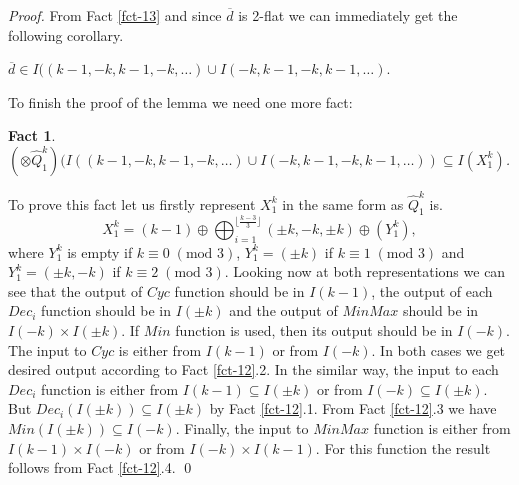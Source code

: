 \documentclass{llncs}
\newtheorem{fact}[theorem]{Fact}
\begin{document}
\begin{proof}
From Fact \ref{fct-13} and since $\overline{d}$ is 2-flat we can immediately 
get the following corollary.
\begin{corollary}
$\overline{d} \in I((k-1,-k,k-1,-k,\ldots) \cup I(-k,k-1,-k,k-1,\ldots)$.
\end{corollary}
To finish the proof of the lemma we need one more fact:
\begin{fact}
$(\otimes \hat{Q}^k_1)(I((k-1,-k,k-1,-k,\ldots) \cup 
I(-k,k-1,-k,k-1,\ldots)) 
\subseteq I(X^k_1)$.
\end{fact}
To prove this fact let us firstly represent $X^k_1$ in the same form as 
$\hat{Q}^k_1$ is.
\[X^k_1 = (k-1) \oplus \bigoplus_{i=1}^{\lfloor\frac{k-3}{3}\rfloor} (\pm 
k,-k,\pm k) \oplus (Y^k_1), \]
where $Y^k_1$ is empty if $k\equiv 0 \;(\mbox{mod } 3)$, $Y^k_1 = (\pm k)$ if 
$k\equiv 1 \;(\mbox{mod } 3)$ and $Y^k_1 = (\pm k,-k)$ if 
$k\equiv 2 \;(\mbox{mod } 3)$. Looking now at both representations we can see 
that the output of $Cyc$ function should be in $I(k-1)$, the output of each 
$Dec_i$ function should be in $I(\pm k)$ and the output of $MinMax$ should be 
in $I(-k)\times I(\pm k)$. If $Min$ function is used, then its output should 
be in $I(-k)$. The input to $Cyc$ is either from $I(k-1)$ or from $I(-k)$. In 
both cases we get desired output according to Fact \ref{fct-12}.2. In the 
similar way, the input to each $Dec_i$ function is either from $I(k-1) 
\subseteq I(\pm k)$ or from $I(-k) \subseteq I(\pm k)$. But $Dec_i(I(\pm k)) 
\subseteq I(\pm k)$ by Fact \ref{fct-12}.1. From Fact \ref{fct-12}.3 we have 
$Min(I(\pm k)) \subseteq I(-k)$. Finally, the input to $MinMax$ function is 
either from $I(k-1)\times I(-k)$ or from $I(-k)\times I(k-1)$. For this 
function the result follows from Fact \ref{fct-12}.4. \qed
\end{proof}
\end{document}
